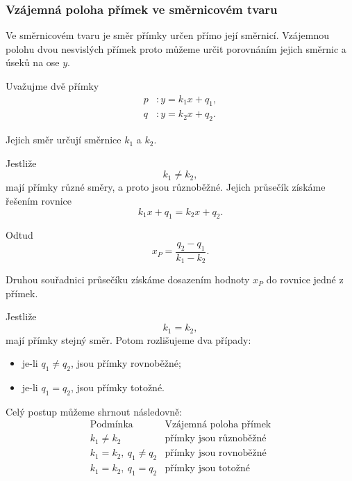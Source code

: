 \subsubsection{Vzájemná poloha přímek ve směrnicovém tvaru}
\label{subsubsec:Relative_position_slope_intercept_lines}

Ve směrnicovém tvaru je směr přímky určen přímo její směrnicí.
Vzájemnou polohu dvou nesvislých přímek proto můžeme určit porovnáním
jejich směrnic a úseků na ose $y$.

Uvažujme dvě přímky
\begin{align*}
    p &: y=k_1x+q_1,\\
    q &: y=k_2x+q_2.
\end{align*}

Jejich směr určují směrnice $k_1$ a $k_2$.

Jestliže
\[
    k_1\neq k_2,
\]
mají přímky různé směry, a proto jsou různoběžné. Jejich průsečík
získáme řešením rovnice
\[
    k_1x+q_1=k_2x+q_2.
\]

Odtud
\begin{equation}\label{eq:Slope_intercept_intersection_x}
    x_P=\frac{q_2-q_1}{k_1-k_2}.
\end{equation}

Druhou souřadnici průsečíku získáme dosazením hodnoty $x_P$ do rovnice
jedné z přímek.

Jestliže
\[
    k_1=k_2,
\]
mají přímky stejný směr. Potom rozlišujeme dva případy:
\begin{itemize}
    \item je-li $q_1\neq q_2$, jsou přímky rovnoběžné;
    \item je-li $q_1=q_2$, jsou přímky totožné.
\end{itemize}

Celý postup můžeme shrnout následovně:
\[
\begin{array}{c|c}
    \text{Podmínka}
    &
    \text{Vzájemná poloha přímek}
    \\
    \hline
    k_1\neq k_2
    &
    \text{přímky jsou různoběžné}
    \\[1mm]
    k_1=k_2,\ q_1\neq q_2
    &
    \text{přímky jsou rovnoběžné}
    \\[1mm]
    k_1=k_2,\ q_1=q_2
    &
    \text{přímky jsou totožné}
\end{array}
\]


